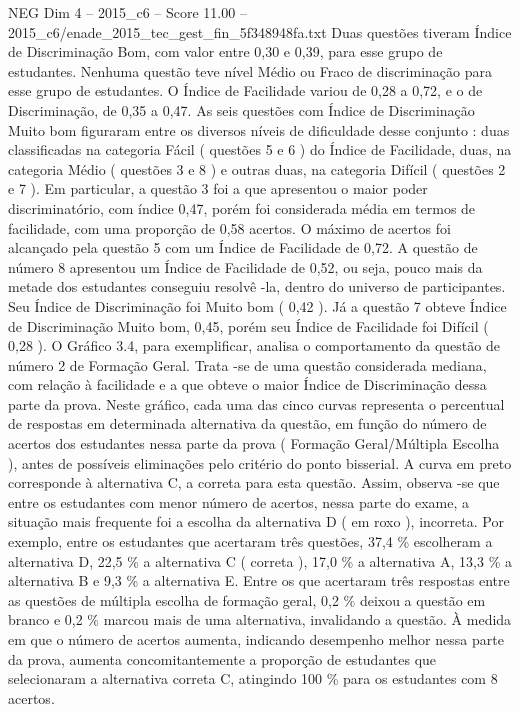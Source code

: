 \begin{textsample}{NEG Dim 4 – 2015\_c6 – Score 11.00 – 2015\_c6/enade\_2015\_tec\_gest\_fin\_5f348948fa.txt}
Duas questões tiveram Índice de Discriminação Bom, com valor entre 0,30 e 0,39, para esse grupo de estudantes.
Nenhuma questão teve nível Médio ou Fraco de discriminação para esse grupo de estudantes.
O Índice de Facilidade variou de 0,28 a 0,72, e o de Discriminação, de 0,35 a 0,47.
As seis questões com Índice de Discriminação Muito bom figuraram entre os diversos níveis de dificuldade desse conjunto : duas classificadas na categoria Fácil ( questões 5 e 6 ) do Índice de Facilidade, duas, na categoria Médio ( questões 3 e 8 ) e outras duas, na categoria Difícil ( questões 2 e 7 ).
Em particular, a questão 3 foi a que apresentou o maior poder discriminatório, com índice 0,47, porém foi considerada média em termos de facilidade, com uma proporção de 0,58 acertos.
O máximo de acertos foi alcançado pela questão 5 com um Índice de Facilidade de 0,72.
A questão de número 8 apresentou um Índice de Facilidade de 0,52, ou seja, pouco mais da metade dos estudantes conseguiu resolvê -la, dentro do universo de participantes.
Seu Índice de Discriminação foi Muito bom ( 0,42 ).
Já a questão 7 obteve Índice de Discriminação Muito bom, 0,45, porém seu Índice de Facilidade foi Difícil ( 0,28 ).
O Gráfico 3.4, para exemplificar, analisa o comportamento da questão de número 2 de Formação Geral.
Trata -se de uma questão considerada mediana, com relação à facilidade e a que obteve o maior Índice de Discriminação dessa parte da prova.
Neste gráfico, cada uma das cinco curvas representa o percentual de respostas em determinada alternativa da questão, em função do número de acertos dos estudantes nessa parte da prova ( Formação Geral/Múltipla Escolha ), antes de possíveis eliminações pelo critério do ponto bisserial.
A curva em preto corresponde à alternativa C, a correta para esta questão.
Assim, observa -se que entre os estudantes com menor número de acertos, nessa parte do exame, a situação mais frequente foi a escolha da alternativa D ( em roxo ), incorreta.
Por exemplo, entre os estudantes que acertaram três questões, 37,4 \% escolheram a alternativa D, 22,5 \% a alternativa C ( correta ), 17,0 \% a alternativa A, 13,3 \% a alternativa B e 9,3 \% a alternativa E.
Entre os que acertaram três respostas entre as questões de múltipla escolha de formação geral, 0,2 \% deixou a questão em branco e 0,2 \% marcou mais de uma alternativa, invalidando a questão.
À medida em que o número de acertos aumenta, indicando desempenho melhor nessa parte da prova, aumenta concomitantemente a proporção de estudantes que selecionaram a alternativa correta C, atingindo 100 \% para os estudantes com 8 acertos.

\end{textsample}
